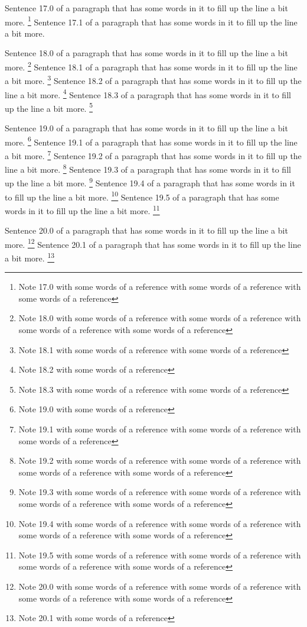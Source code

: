 Sentence 17.0 of a paragraph that has some words in it to fill up the line a bit more. \footnote{Note 17.0 with some words of a reference with some words of a reference with some words of a reference} Sentence 17.1 of a paragraph that has some words in it to fill up the line a bit more.

Sentence 18.0 of a paragraph that has some words in it to fill up the line a bit more. \footnote{Note 18.0 with some words of a reference with some words of a reference with some words of a reference with some words of a reference} Sentence 18.1 of a paragraph that has some words in it to fill up the line a bit more. \footnote{Note 18.1 with some words of a reference with some words of a reference} Sentence 18.2 of a paragraph that has some words in it to fill up the line a bit more. \footnote{Note 18.2 with some words of a reference} Sentence 18.3 of a paragraph that has some words in it to fill up the line a bit more. \footnote{Note 18.3 with some words of a reference with some words of a reference}

Sentence 19.0 of a paragraph that has some words in it to fill up the line a bit more. \footnote{Note 19.0 with some words of a reference} Sentence 19.1 of a paragraph that has some words in it to fill up the line a bit more. \footnote{Note 19.1 with some words of a reference with some words of a reference with some words of a reference} Sentence 19.2 of a paragraph that has some words in it to fill up the line a bit more. \footnote{Note 19.2 with some words of a reference with some words of a reference with some words of a reference with some words of a reference} Sentence 19.3 of a paragraph that has some words in it to fill up the line a bit more. \footnote{Note 19.3 with some words of a reference with some words of a reference with some words of a reference with some words of a reference} Sentence 19.4 of a paragraph that has some words in it to fill up the line a bit more. \footnote{Note 19.4 with some words of a reference with some words of a reference with some words of a reference with some words of a reference} Sentence 19.5 of a paragraph that has some words in it to fill up the line a bit more. \footnote{Note 19.5 with some words of a reference with some words of a reference with some words of a reference with some words of a reference}

Sentence 20.0 of a paragraph that has some words in it to fill up the line a bit more. \footnote{Note 20.0 with some words of a reference with some words of a reference with some words of a reference with some words of a reference} Sentence 20.1 of a paragraph that has some words in it to fill up the line a bit more. \footnote{Note 20.1 with some words of a reference}

